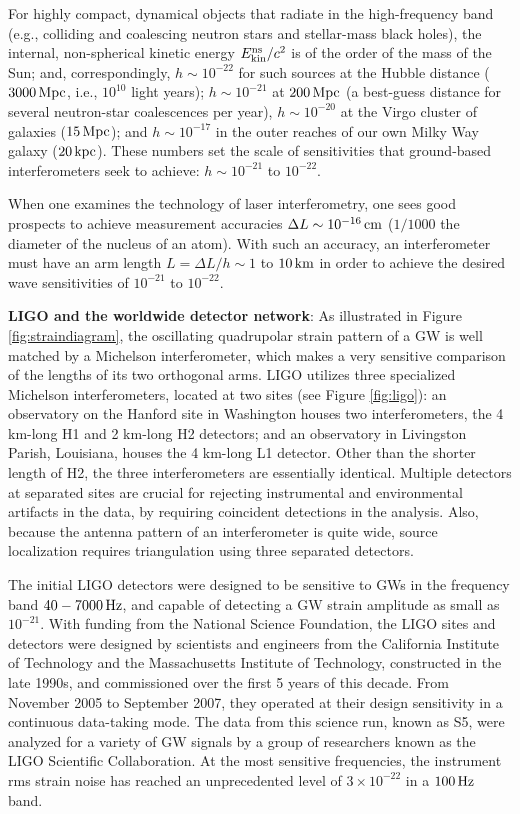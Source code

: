 \documentclass[a4paper,10pt]{article}
\begin{document}
{\noindent}For highly compact, dynamical objects that radiate in the high-frequency band (e.g., colliding and coalescing neutron stars and stellar-mass black holes), the internal, non-spherical kinetic energy $E_{\rm kin}^{\rm ns}/c^2$ is of the order of the mass of the Sun; and, correspondingly, $h\sim10^{-22}$ for such sources at the Hubble distance ($3000\,{\rm Mpc}$, i.e., $10^{10}$ light years); $h\sim10^{-21}$ at $200\,{\rm Mpc}$ (a best-guess distance for several neutron-star coalescences per year), $h\sim10^{- 20}$ at the Virgo cluster of galaxies ($15\,{\rm Mpc}$); and $h\sim10^{-17}$ in the outer reaches of our own Milky Way galaxy ($20\,{\rm kpc}$). These numbers set the scale of sensitivities that ground-based interferometers seek to achieve: $h\sim10^{-21}$ to $10^{-22}$.

{\noindent}When one examines the technology of laser interferometry, one sees good prospects to achieve measurement accuracies $\Delta L\sim10^{-16}\,{\rm cm}$ ($1/1000$ the diameter of the nucleus of an atom). With such an accuracy, an interferometer must have an arm length $L=\Delta L/h\sim1$ to $10\,{\rm km}$ in order to achieve the desired wave sensitivities of $10^{-21}$ to $10^{-22}$.

{\noindent}\textbf{LIGO and the worldwide detector network}: As illustrated in Figure \ref{fig:straindiagram}, the oscillating quadrupolar strain pattern of a GW is well matched by a Michelson interferometer, which makes a very sensitive comparison of the lengths of its two orthogonal arms. LIGO utilizes three specialized Michelson interferometers, located at two sites (see Figure \ref{fig:ligo}): an observatory on the Hanford site in Washington houses two interferometers, the 4 km-long H1 and 2 km-long H2 detectors; and an observatory in Livingston Parish, Louisiana, houses the 4 km-long L1 detector. Other than the shorter length of H2, the three interferometers are essentially identical. Multiple detectors at separated sites are crucial for rejecting instrumental and environmental artifacts in the data, by requiring coincident detections in the analysis. Also, because the antenna pattern of an interferometer is quite wide, source localization requires triangulation using three separated detectors.

{\noindent}The initial LIGO detectors were designed to be sensitive to GWs in the frequency band $40-7000\,{\rm Hz}$, and capable of detecting a GW strain amplitude as small as $10^{-21}$. With funding from the National Science Foundation, the LIGO sites and detectors were designed by scientists and engineers from the California Institute of Technology and the Massachusetts Institute of Technology, constructed in the late 1990s, and commissioned over the first 5 years of this decade. From November 2005 to September 2007, they operated at their design sensitivity in a continuous data-taking mode. The data from this science run, known as S5, were analyzed for a variety of GW signals by a group of researchers known as the LIGO Scientific Collaboration. At the most sensitive frequencies, the instrument rms strain noise has reached an unprecedented level of $3\times10^{-22}$ in a $100\,{\rm Hz}$ band.
\end{document}
